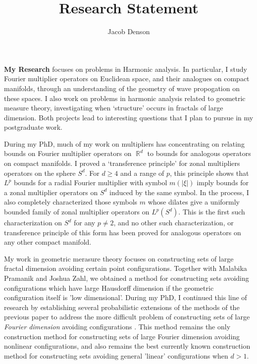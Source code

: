 \documentclass[12pt]{article}
\title{Research Statement}
\author{Jacob Denson}
\date{}
\DeclareMathOperator{\RR}{\mathbb{R}}
\begin{document}
\maketitle

{\bf My Research} focuses on problems in Harmonic analysis. In particular, I study Fourier multiplier operators on Euclidean space, and their analogues on compact manifolds, through an understanding of the geometry of wave propogation on these spaces. I also work on problems in harmonic analysis related to geometric measure theory, investigating when `structure' occurs in fractals of large dimension. Both projects lead to interesting questions that I plan to pursue in my postgraduate work.

During my PhD, much of my work on multipliers has concentrating on relating bounds on Fourier multiplier operators on $\RR^d$ to bounds for analogous operators on compact manifolds. I proved a `transference principle' \cite{DensonCharacterization} for zonal multipliers operators on the sphere $S^d$. For $d \geq 4$ and a range of $p$, this principle shows that $L^p$ bounds for a radial Fourier multiplier with symbol $m(|\xi|)$ imply bounds for a zonal multiplier operators on $S^d$ induced by the same symbol. In the process, I also completely characterized those symbols $m$ whose dilates give a uniformly bounded family of zonal multiplier operators on $L^p(S^d)$. This is the first such characterization on $S^d$ for any $p \neq 2$, and no other such characterization, or transference principle of this form has been proved for analogous operators on any other compact manifold.

My work in geometric merasure theory focuses on constructing sets of large fractal dimension avoiding certain point configurations. Together with Malabika Pramanik and Joshua Zahl, we obtained a method \cite{DensonPramanikZahl} for constructing sets avoiding configurations which have large Hausdorff dimension if the geometric configuration itself is 'low dimensional'. During my PhD, I continued this line of research by establishing several probabilistic extensions of the methods of the previous paper to address the more difficult problem of constructing sets of large \emph{Fourier dimension} avoiding configurations \cite{DensonFourier}. This method remains the only construction method for constructing sets of large Fourier dimension avoiding nonlinear configurations, and also remains the best currently known construction method for constructing sets avoiding general 'linear' configurations when $d > 1$.
\end{document}
